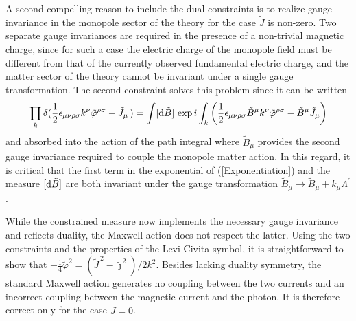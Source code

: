 \documentclass[a4paper,a4paper]{article}
\begin{document}
A second compelling reason to include the dual constraints is to realize gauge invariance in the monopole sector of the theory for the case $\tilde{J}$ is non-zero.  Two separate gauge invariances are required in the presence of a non-trivial magnetic charge, since for such a case the electric charge of the monopole field must be different from that of the currently observed fundamental electric charge, and the matter sector of the theory cannot be invariant under a single gauge transformation.  The second constraint solves this problem since it can be written 
\begin{equation}
\label{Exponentiation}
 \prod_k \delta( \frac{1}{2} \epsilon_{\mu \nu \rho \sigma} k^\nu \tilde{\varphi}^{\rho \sigma} - \tilde{J}_\mu \,)  = \int [{\rm d}\tilde{B}] 
\, \exp i \int_k  \left( \frac{1}{2} \epsilon_{\mu \nu \rho \sigma} \tilde{B}^\mu k^\nu \tilde{\varphi}^{\rho \sigma} - \tilde{B}^\mu \tilde{J}_\mu  \right) 
\end{equation}
and absorbed into the action of the path integral where $\tilde{B}_\mu$ provides the second gauge invariance required to couple the monopole matter action. In this regard, it is critical that the first term in the exponential of (\ref{Exponentiation}) and the measure $[{\rm d} \tilde{B}]$ are both invariant under the gauge transformation $\tilde{B}_\mu \rightarrow \tilde{B}_\mu + k_\mu \Lambda^\prime$.

While the constrained measure now implements the necessary gauge invariance and reflects duality, the Maxwell action does not respect the latter. Using the two constraints and the properties of the Levi-Civita symbol, it is straightforward to show that $ - \frac{1}{4} \tilde{\varphi}^2 = ( \tilde{J}^{\, 2} - \tilde{\jmath}^{\, 2} )/2k^2$.  Besides lacking duality symmetry, the standard Maxwell action generates no coupling between the two currents and an incorrect coupling between the magnetic current and the photon.  It is therefore correct only for the case $\tilde{J} = 0$. 
\end{document}
